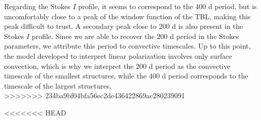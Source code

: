 \documentclass{aa}
\begin{document}
Regarding the Stokes $I$ profile, it seems to correspond to the 400 d period, but is uncomfortably close to a peak of the window function of the TBL, making this peak difficult to trust. A secondary peak close to 200 d is also present in the Stokes $I$ profile. Since we are able to recover the 200 d period in the Stokes parameters, we attribute this period to convective timescales. Up to this point, the model developed to interpret linear polarization involves only surface convection, which is why we interpret the 200 d period as the convective timescale of the smallest structures, while the 400 d period corresponds to the timescale of the largest structures.\\
>>>>>>> 234ba9bf04bfa56ec2de436422869ac280239091


<<<<<<< HEAD

\end{document}

